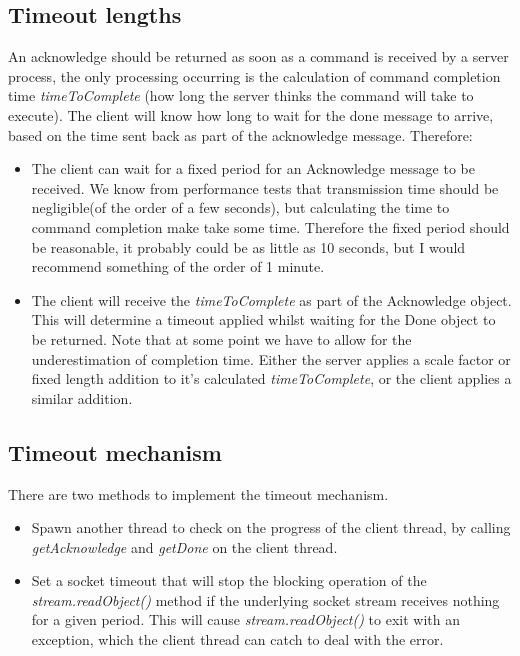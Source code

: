 \documentclass[10pt,a4paper]{article}
\begin{document}
\subsection{Timeout lengths}
An acknowledge should be returned as soon as a command is received by a server process,
the only processing occurring is the calculation of command completion time {\em timeToComplete} 
(how long the server thinks the command will
take to execute). The client will know how long to wait for the done message to arrive, based on the time
sent back as part of the acknowledge message. Therefore:
\begin{itemize}
\item The client can wait for a fixed period for an Acknowledge message to be received. We know from performance
tests \cite{bib:ngatnetnptlatex} that transmission time should be negligible(of the order of a few seconds), 
but calculating the time to command completion make take some time. Therefore the fixed period should be 
reasonable, it probably could be as little as 10 seconds, but I would recommend something of the order of 1 minute.
\item The client will receive the {\em timeToComplete} as part of the Acknowledge object. This will determine a timeout
applied whilst waiting for the Done object to be returned. Note that at some point we have to allow for the
underestimation of completion time. Either the server applies a scale factor or fixed length addition to it's
calculated {\em timeToComplete}, or the client applies a similar addition.
\end{itemize}

\subsection{Timeout mechanism}
There are two methods to implement the timeout mechanism. 
\begin{itemize}
\item Spawn another thread to check on the
progress of the client thread, by calling {\em getAcknowledge} and {\em getDone} on the client thread.
\item Set a socket timeout that will stop the blocking operation of the {\em stream.readObject()} method
if the underlying socket stream receives nothing for a given period. This will cause {\em stream.readObject()}
to exit with an exception, which the client thread can catch to deal with the error.
\end{itemize}
\end{document}
